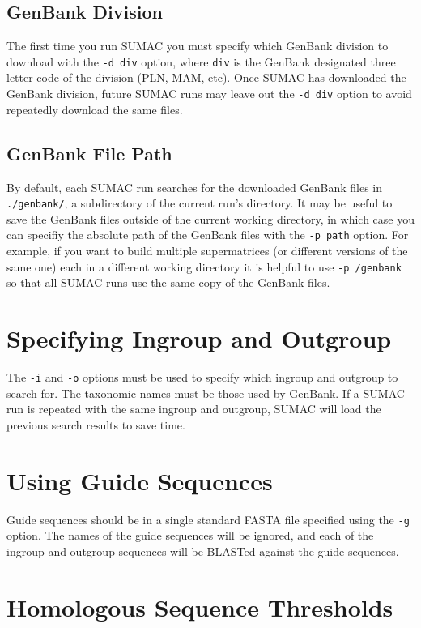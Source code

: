 \documentclass[12pt]{report}
\begin{document}
\subsection{GenBank Division}

The first time you run SUMAC you must specify which GenBank division
to download with the \verb|-d div| option, where \verb|div| is the
GenBank designated three letter code of the division (PLN, MAM, etc).
Once SUMAC has downloaded the GenBank division, future SUMAC runs
may leave out the \verb|-d div| option to avoid repeatedly
download the same files.

\subsection{GenBank File Path}

By default, each SUMAC run searches for the downloaded GenBank files
in \verb|./genbank/|, a subdirectory of the current run's directory.
It may be useful to save the GenBank files outside of the current working
directory, in which case 
you can specifiy the absolute path of the GenBank files with the \verb|-p path| option.
For example, if you want to build
multiple supermatrices (or different versions of the same one) each in a different working directory
it is helpful
to use \verb|-p /genbank| so that all SUMAC runs use the same copy of the GenBank files.

\section{Specifying Ingroup and Outgroup}

The \verb|-i| and \verb|-o| options must be used to specify which ingroup and
outgroup to search for. The taxonomic names must be those used by GenBank.
If a SUMAC run is repeated with the same ingroup and outgroup, SUMAC
will load the previous search results to save time.

\section{Using Guide Sequences}

Guide sequences should be in a single standard FASTA file specified
using the \verb|-g| option. The names of the
guide sequences will be ignored, and each of the ingroup and outgroup 
sequences will be BLASTed against the guide sequences.

\section{Homologous Sequence Thresholds}
\end{document}
